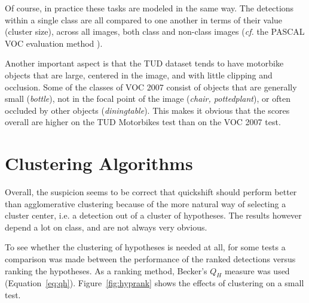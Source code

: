 Of course, in practice these tasks are modeled in the same way. The detections within a single class are all compared to one another in terms of their value (cluster size), across all images, both class and non-class images (\emph{cf.} the PASCAL VOC evaluation method \cite{pascal-voc-2007}).

Another important aspect is that the TUD dataset tends to have motorbike objects that are large, centered in the image, and with little clipping and occlusion. Some of the classes of VOC 2007 consist of objects that are generally small (\emph{bottle}), not in the focal point of the image (\emph{chair, pottedplant}), or often occluded by other objects (\emph{diningtable}). This makes it obvious that the scores overall are higher on the TUD Motorbikes test than on the VOC 2007 test.



\section{Clustering Algorithms} %
\label{sub:anal_clustering_algorithms}

Overall, the suspicion seems to be correct that quickshift should perform better than agglomerative clustering because of the more natural way of selecting a cluster center, i.e. a detection out of a cluster of hypotheses. The results however depend a lot on class, and are not always very obvious.

To see whether the clustering of hypotheses is needed at all, for some tests a comparison was made between the performance of the ranked detections versus ranking the hypotheses. As a ranking method, Becker's $Q_H$ measure was used (Equation~\ref{eq:qh}). Figure~\ref{fig:hyprank} shows the effects of clustering on a small test.

